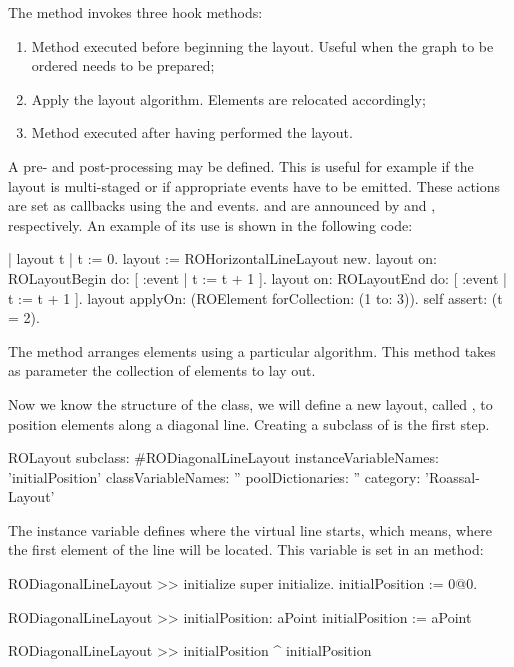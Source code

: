 \documentclass[a4paper,10pt,twoside]{book}
\begin{document}
The  method invokes three hook methods:

\begin{enumerate}
\item {} Method executed before beginning the layout. Useful when the graph to be ordered needs to be prepared;
\item {} Apply the layout algorithm. Elements are relocated accordingly;
\item {} Method executed after having performed the layout. 
\end{enumerate}

A pre- and post-processing may be defined. This is useful for example if the layout is multi-staged or if appropriate events have to be emitted. These actions are set as callbacks using the  and  events.
 and  are announced by  and , respectively. An example of its use is shown in the following code:

\begin{code}{}
| layout t |
t := 0.
layout := ROHorizontalLineLayout new.
layout on: ROLayoutBegin do: [ :event | t := t + 1 ].
layout on: ROLayoutEnd do: [ :event | t := t + 1 ].
layout applyOn: (ROElement forCollection: (1 to: 3)).
self assert: (t = 2).
\end{code}

The  method arranges elements using a particular algorithm. This method takes as parameter the collection of elements to lay out.

Now we know the structure of the  class, we will define a new layout, called , to position elements along a diagonal line.
Creating a subclass of  is the first step. 

\begin{code}{}
ROLayout subclass: #RODiagonalLineLayout
	instanceVariableNames: 'initialPosition'
	classVariableNames: ''
	poolDictionaries: ''
	category: 'Roassal-Layout'
\end{code}

The instance variable  defines where the virtual line starts, which means, where the first element of the line will be located. This variable is set in an  method:

\begin{code}{}
RODiagonalLineLayout >> initialize
	super initialize.
	initialPosition := 0@0.
	
RODiagonalLineLayout >> initialPosition: aPoint
	initialPosition := aPoint
	
RODiagonalLineLayout >> initialPosition
	^ initialPosition
\end{code}
\end{document}
